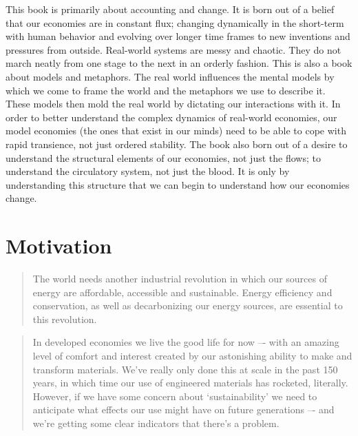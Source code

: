 
This book is primarily about accounting and change. 
It is born out of a belief that our economies are in constant flux;
changing dynamically in the short-term with human behavior 
and evolving over longer time frames to new inventions and
pressures from outside.
Real-world systems are messy and chaotic.
They do not march neatly from one stage to the next 
in an orderly fashion.
This is also a book about models and metaphors.
The real world influences the mental models 
by which we come to frame the world and 
the metaphors we use to describe it. 
These models then mold the real world by dictating our
interactions with it.
In order to better understand the complex dynamics 
of real-world economies, 
our model economies
(the ones that exist in our minds)
need to be able to cope with rapid transience,
not just ordered stability.
The book also born out of a desire to understand
the structural elements of our economies,
not just the flows;
to understand the circulatory system,
not just the blood.
It is only by understanding this structure that we can 
begin to understand how our economies change.


\section{Motivation}
\label{sec:motivation}

\begin{quotation}
The world needs another industrial revolution 
in which our sources of energy are affordable, 
accessible and sustainable. 
Energy efficiency and conservation, 
as well as decarbonizing our energy sources, 
are essential to this revolution.~\cite[p.294]{Chu2012}
\end{quotation}

\begin{quotation}
In developed economies we live the good life for now –-
with an amazing level of comfort and interest 
created by our astonishing ability to 
make and transform materials. 
We've really only done this at scale in the past 150 years, 
in which time our use of engineered materials has rocketed, 
literally. 
However, if we have some concern about `sustainability' 
we need to anticipate what effects our use might have 
on future generations –-
and we're getting some clear indicators that there's a 
problem.~\cite[p.3]{allwood2012sustainable}
\end{quotation}


